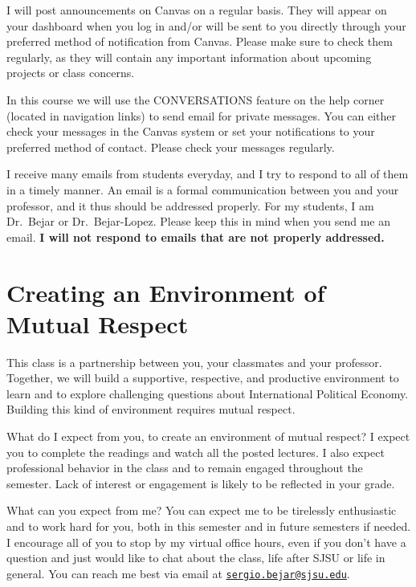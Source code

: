 \documentclass[11pt,]{article}
\begin{document}
I will post announcements on Canvas on a regular basis. They will appear
on your dashboard when you log in and/or will be sent to you directly
through your preferred method of notification from Canvas. Please make
sure to check them regularly, as they will contain any important
information about upcoming projects or class concerns.

In this course we will use the CONVERSATIONS feature on the help corner
(located in navigation links) to send email for private messages. You
can either check your messages in the Canvas system or set your
notifications to your preferred method of contact. Please check your
messages regularly.

I receive many emails from students everyday, and I try to respond to
all of them in a timely manner. An email is a formal communication
between you and your professor, and it thus should be addressed
properly. For my students, I am Dr.~Bejar or Dr.~Bejar-Lopez. Please
keep this in mind when you send me an email. \textbf{I will not respond
to emails that are not properly addressed.}

\hypertarget{creating-an-environment-of-mutual-respect}{%
\section{Creating an Environment of Mutual
Respect}\label{creating-an-environment-of-mutual-respect}}

This class is a partnership between you, your classmates and your
professor. Together, we will build a supportive, respective, and
productive environment to learn and to explore challenging questions
about International Political Economy. Building this kind of environment
requires mutual respect.

What do I expect from you, to create an environment of mutual respect? I
expect you to complete the readings and watch all the posted lectures. I
also expect professional behavior in the class and to remain engaged
throughout the semester. Lack of interest or engagement is likely to be
reflected in your grade.

What can you expect from me? You can expect me to be tirelessly
enthusiastic and to work hard for you, both in this semester and in
future semesters if needed. I encourage all of you to stop by my virtual
office hours, even if you don't have a question and just would like to
chat about the class, life after SJSU or life in general. You can reach
me best via email at
\href{mailto:sergio.bejar@sjsu.edu}{\nolinkurl{sergio.bejar@sjsu.edu}}.
\end{document}
